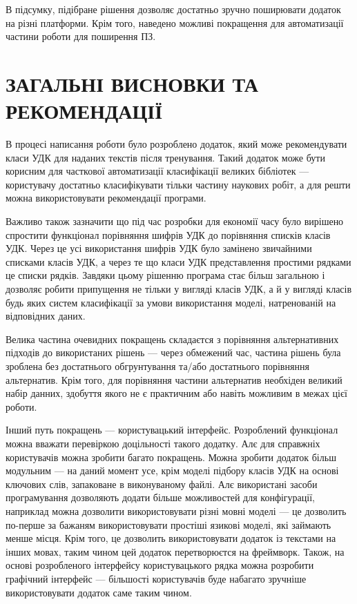 \documentclass[14pt]{extarticle}
\let\oldsection\section
\renewcommand{\section}{\clearpage\oldsection}
\newcommand{\unnumberedSection}[1]{%
  \section*{#1}%
  \phantomsection
  \addcontentsline{toc}{section}{#1}%
}
\begin{document}
  В підсумку, підібране рішення дозволяє достатньо зручно поширювати
  додаток на різні платформи. Крім того,
  наведено можливі покращення для автоматизації частини роботи для поширення ПЗ.

  \unnumberedSection{ЗАГАЛЬНІ ВИСНОВКИ ТА РЕКОМЕНДАЦІЇ}
  В процесі написання роботи було розроблено додаток,
  який може рекомендувати класи УДК для наданих текстів після тренування.
  Такий додаток може бути корисним для часткової автоматизації
  класифікації великих бібліотек ---
  користувачу достатньо класифікувати тільки частину наукових робіт,
  а для решти можна використовувати рекомендації програми.

  Важливо також зазначити що під час розробки для економії часу було вирішено
  спростити функціонал порівняння шифрів УДК до порівняння списків класів УДК.
  Через це усі використання шифрів УДК було замінено звичайними
  списками класів УДК, а через те що класи УДК представлення простими рядками
  це списки рядків.
  Завдяки цьому рішенню програма стає більш загальною і дозволяє робити
  припущення не тільки у вигляді класів УДК, а й у вигляді класів
  будь яких систем класифікації за умови використання моделі,
  натренованій на відповідних даних.

  Велика частина очевидних покращень складаєтся з порівняння альтернативних
  підходів до використаних рішень --- через обмежений час,
  частина рішень була зроблена без достатнього обгрунтування та/або
  достатнього порівняння альтернатив. Крім того,
  для порівняння частини альтернатив необхіден великий набір данних,
  здобуття якого не є практичним або навіть можливим в межах цієї роботи.

  Інший путь покращень --- користувацький інтерфейс.
  Розроблений функціонал можна вважати перевіркою доцільності такого додатку.
  Алє для справжніх користувачів можна зробити багато покращень.
  Можна зробити додаток більш модульним --- на даний момент усе,
  крім моделі підбору класів УДК на основі ключових слів,
  запаковане в виконуваному файлі.
  Алє використані засоби програмування дозволяють додати більше можливостей
  для конфігурації, наприклад можна дозволити використовувати різні мовні моделі
  --- це дозволить по-перше за бажаням використовувати простіші язикові моделі,
  які займають менше місця. Крім того,
  це дозволить використовувати додаток із текстами на інших мовах,
  таким чином цей додаток перетворюєтся на фреймворк.
  Також, на основі розробленого інтерфейсу користувацького рядка
  можна розробити графічний інтерфейс ---
  більшості користувачів буде набагато зручніше використовувати додаток
  саме таким чином.
\end{document}
